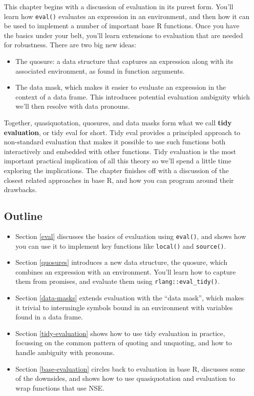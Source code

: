 \documentclass[]{book}
\begin{document}
This chapter begins with a discussion of evaluation in its purest form. You'll learn how \texttt{eval()} evaluates an expression in an environment, and then how it can be used to implement a number of important base R functions. Once you have the basics under your belt, you'll learn extensions to evaluation that are needed for robustness. There are two big new ideas:

\begin{itemize}
\item
  The quosure: a data structure that captures an expression along with its
  associated environment, as found in function arguments.
\item
  The data mask, which makes it easier to evaluate an expression in the
  context of a data frame. This introduces potential evaluation ambiguity
  which we'll then resolve with data pronouns.
\end{itemize}

Together, quasiquotation, quosures, and data masks form what we call \textbf{tidy evaluation}, or tidy eval for short. Tidy eval provides a principled approach to non-standard evaluation that makes it possible to use such functions both interactively and embedded with other functions. Tidy evaluation is the most important practical implication of all this theory so we'll spend a little time exploring the implications. The chapter finishes off with a discussion of the closest related approaches in base R, and how you can program around their drawbacks.

\hypertarget{outline-3}{%
\subsection*{Outline}\label{outline-3}}

\begin{itemize}
\item
  Section \ref{eval} discusses the basics of evaluation using \texttt{eval()},
  and shows how you can use it to implement key functions like \texttt{local()}
  and \texttt{source()}.
\item
  Section \ref{quosures} introduces a new data structure, the quosure, which
  combines an expression with an environment. You'll learn how to capture
  them from promises, and evaluate them using \texttt{rlang::eval\_tidy()}.
\item
  Section \ref{data-masks} extends evaluation with the ``data mask'', which
  makes it trivial to intermingle symbols bound in an environment with
  variables found in a data frame.
\item
  Section \ref{tidy-evaluation} shows how to use tidy evaluation in practice,
  focussing on the common pattern of quoting and unquoting, and how to
  handle ambiguity with pronouns.
\item
  Section \ref{base-evaluation} circles back to evaluation in base R,
  discusses some of the downsides, and shows how to use quasiquotation and
  evaluation to wrap functions that use NSE.
\end{itemize}
\end{document}
